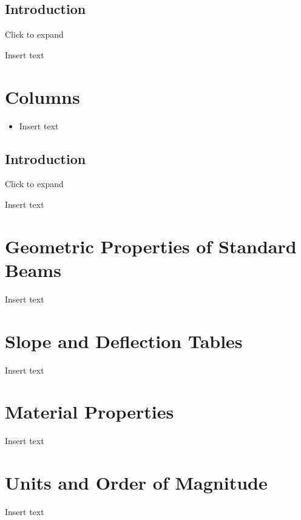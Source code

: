 \documentclass[
  letterpaper,
  DIV=11,
  numbers=noendperiod]{scrreprt}
\providecommand{\tightlist}{%
  \setlength{\itemsep}{0pt}\setlength{\parskip}{0pt}}\usepackage{longtable,booktabs,array}
\begin{document}
\section{Introduction}\label{introduction-14}

Click to expand

Insert text


\chapter{Columns}\label{sec-columns}

\begin{tcolorbox}[enhanced jigsaw, colback=white, colframe=quarto-callout-note-color-frame, leftrule=.75mm, opacitybacktitle=0.6, colbacktitle=quarto-callout-note-color!10!white, arc=.35mm, bottomrule=.15mm, breakable, title={Learning Objectives}, left=2mm, titlerule=0mm, toptitle=1mm, toprule=.15mm, opacityback=0, rightrule=.15mm, coltitle=black, bottomtitle=1mm]

\begin{itemize}
\tightlist
\item
  Insert text
\end{itemize}

\end{tcolorbox}

\section{Introduction}\label{introduction-15}

Click to expand

Insert text

\cleardoublepage
{}
{}
\appendix

\chapter{Geometric Properties of Standard
Beams}\label{geometric-properties-of-standard-beams}

Insert text

\chapter{Slope and Deflection Tables}\label{slope-and-deflection-tables}

Insert text

\chapter{Material Properties}\label{material-properties}

Insert text

\chapter{Units and Order of
Magnitude}\label{units-and-order-of-magnitude}

Insert text
\end{document}
